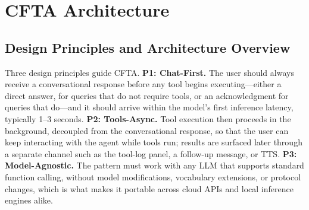 \documentclass[numbered,mediumone,traditional]{oup-authoring-template}
\begin{document}
\begin{table}[htbp]
\caption{Comparison of asynchronous tool execution approaches.}
\label{tab:landscape}
\centering
{}
\end{table}

\section{CFTA Architecture}

\subsection{Design Principles and Architecture Overview}

Three design principles guide CFTA. \textbf{P1: Chat-First.} The user should always receive a conversational response before any tool begins executing---either a direct answer, for queries that do not require tools, or an acknowledgment for queries that do---and it should arrive within the model's first inference latency, typically 1--3 seconds. \textbf{P2: Tools-Async.} Tool execution then proceeds in the background, decoupled from the conversational response, so that the user can keep interacting with the agent while tools run; results are surfaced later through a separate channel such as the tool-log panel, a follow-up message, or TTS. \textbf{P3: Model-Agnostic.} The pattern must work with any LLM that supports standard function calling, without model modifications, vocabulary extensions, or protocol changes, which is what makes it portable across cloud APIs and local inference engines alike.
\end{document}

